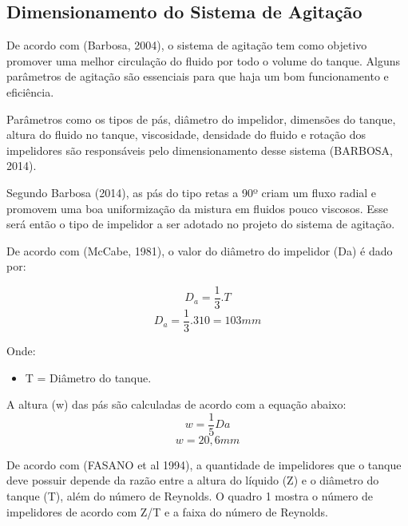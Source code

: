 \subsection{Dimensionamento do Sistema de Agitação}

De acordo com (Barbosa, 2004), o sistema de agitação tem como objetivo promover uma melhor circulação do fluido por todo o volume do tanque. Alguns parâmetros de agitação são essenciais para que haja um bom funcionamento e eficiência.

Parâmetros como os tipos de pás, diâmetro do impelidor, dimensões do tanque, altura do fluido no tanque, viscosidade, densidade do fluido e rotação dos impelidores são responsáveis pelo dimensionamento desse sistema (BARBOSA, 2014).

Segundo Barbosa (2014), as pás do tipo retas a 90º criam um fluxo radial e promovem uma boa uniformização da mistura em fluidos pouco viscosos. Esse será então o tipo de impelidor a ser adotado no projeto do sistema de agitação.

De acordo com (McCabe, 1981), o valor do diâmetro do impelidor (Da) é dado por:

\[D_{a}=\frac{1}{3}.T\]
\[D_{a}=\frac{1}{3}.310 = 103mm\]

Onde:
\begin{itemize}
	\item T = Diâmetro do tanque.
\end{itemize}

A altura (w) das pás são calculadas de acordo com a equação abaixo:
\[w = \frac{1}{5}Da\]
\[w = 20,6 mm\]

De acordo com (FASANO et al 1994), a quantidade de impelidores que o tanque deve possuir depende da razão entre a altura do líquido (Z) e o diâmetro do tanque (T), além do número de Reynolds. O quadro 1 mostra o número de impelidores de acordo com Z/T e a faixa do número de Reynolds.


